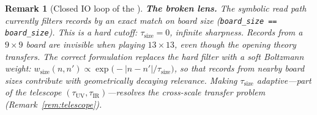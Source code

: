 \documentclass[11pt,a4paper]{article}
\newtheorem{remark}[theorem]{Remark}
\begin{document}
\begin{remark}[Closed IO loop of the
  \begin{CJK}{UTF8}{gbsn}棋谱\end{CJK}]
\medskip\noindent
\textbf{The broken lens.}\;
The symbolic read path currently filters records by an exact
match on board size (\texttt{board\_size == board\_size}).
This is a hard cutoff: $\tau_{\text{size}} = 0$, infinite
sharpness.
Records from a $9\times 9$ board are invisible when playing
$13\times 13$, even though the opening theory transfers.
The correct formulation replaces the hard filter with a soft
Boltzmann weight:
$w_{\text{size}}(n, n') \propto \exp\bigl(-|n - n'| /
\tau_{\text{size}}\bigr)$,
so that records from nearby board sizes contribute with
geometrically decaying relevance.
Making $\tau_{\text{size}}$ adaptive---part of the telescope
$(\tau_{\text{UV}}, \tau_{\text{IR}})$---resolves the
cross-scale transfer problem
(Remark~\ref{rem:telescope}).
\end{remark}
\end{document}
